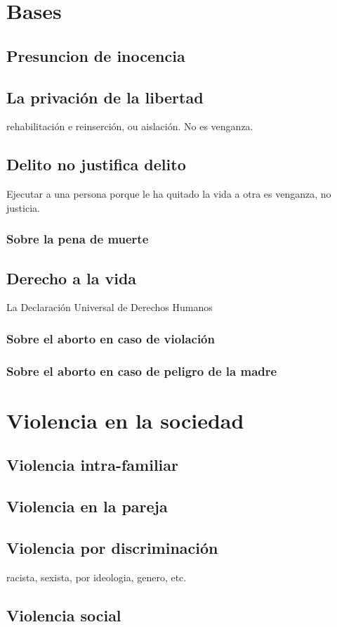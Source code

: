 \chapter{Bases }
\section{Presuncion de inocencia} 

\section{La privación de la libertad}
rehabilitación e reinserción, ou aislación. No es venganza.

\section{Delito no justifica delito}
Ejecutar a una persona porque le ha quitado la vida a otra es venganza, no justicia.

\subsection{Sobre la pena de muerte}


\section{Derecho a la vida} 

La Declaración Universal de Derechos Humanos  \cite{DUDH}

\subsection{Sobre el aborto en caso de violación}
\subsection{Sobre el aborto en caso de peligro de la madre}

\chapter{Violencia en la sociedad}

\section{Violencia intra-familiar} 

\section{Violencia en la pareja} 

\section{Violencia por discriminación} 
racista, sexista, por ideologia, genero, etc.

\section{Violencia social} 

